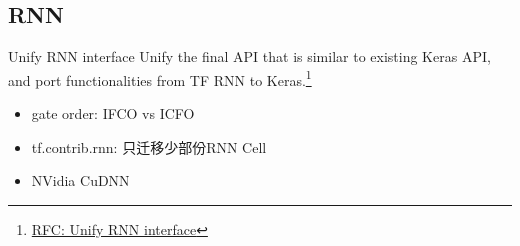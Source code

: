 
\subsection{RNN}

\begin{frame}{Unify RNN interface}
    Unify the final API that is similar to existing Keras API, and port functionalities from TF RNN to Keras.\footnote{\href{https://github.com/tensorflow/community/pull/15/}{RFC: Unify RNN interface}}

    \begin{itemize}
        \item gate order: IFCO vs ICFO
        \item tf.contrib.rnn: 只迁移少部份RNN Cell
        \item NVidia CuDNN
    \end{itemize}

\end{frame}

